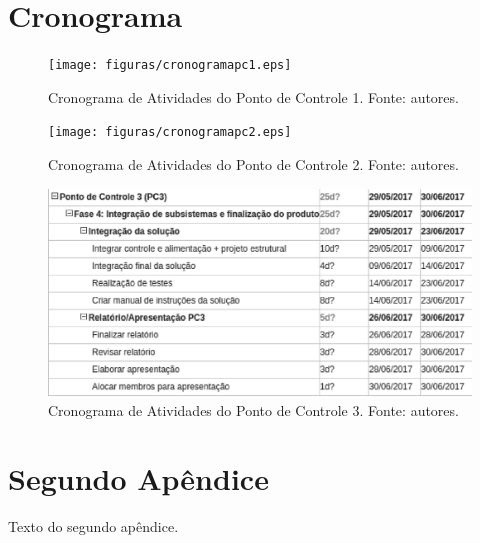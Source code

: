 \begin{apendicesenv}

\partapendices

\chapter{Cronograma}
\label{schedule_appendix}

\begin{figure}[!htbp]
  \centering
  \texttt{[image: figuras/cronogramapc1.eps]}
  \caption{Cronograma de Atividades do Ponto de Controle 1. Fonte: autores.}
  \label{fig:cron_d1}
\end{figure}

\begin{figure}[!htbp]
  \centering
  \texttt{[image: figuras/cronogramapc2.eps]}
  \caption{Cronograma de Atividades do Ponto de Controle 2. Fonte: autores.}
  \label{fig:cron_d1}
\end{figure}

\begin{figure}[!htbp]
  \centering
  \includegraphics[width=\textwidth]{figuras/cronogramapc3.eps}
  \caption{Cronograma de Atividades do Ponto de Controle 3. Fonte: autores.}
  \label{fig:cron_d1}
\end{figure}

\chapter{Segundo Apêndice}

Texto do segundo apêndice.

\end{apendicesenv}
